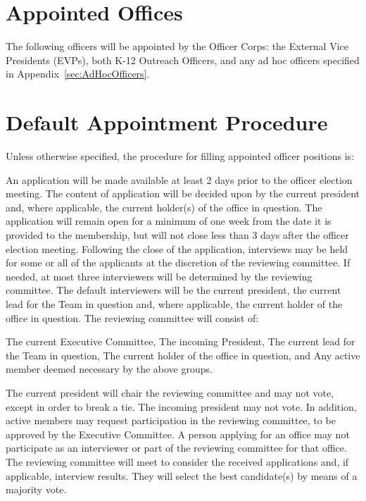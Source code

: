\section{Appointed Offices}\label{sec:appointedofficers} The following officers will be appointed by the Officer Corps: the External Vice Presidents (EVPs), both K-12 Outreach Officers, and any ad hoc officers specified in Appendix~\ref{sec:AdHocOfficers}. %
\section{Default Appointment Procedure} Unless otherwise specified, the procedure for filling appointed officer positions is: 
\begin{enumsubsection}
	\itemnotoc An application will be made available at least 2 days prior to the officer election meeting.
	\itemnotoc The content of application will be decided upon by the current president and, where applicable, the current holder(s) of the office in question. 
	\itemnotoc The application will remain open for a minimum of one week from the date it is provided to the membership, but will not close less than 3 days after the officer election meeting.
	\itemnotoc Following the close of the application, interviews may be held for some or all of the applicants at the discretion of the reviewing committee. If needed, at most three interviewers will be determined by the reviewing committee. The default interviewers will be the current president, the current lead for the Team in question and, where applicable, the current holder of the office in question.
	\itemnotoc The reviewing committee will consist of: \label{sec:defaultappointcomp}
	\begin{enumsubsubsection}
		\itemnotoc The current Executive Committee,
		\itemnotoc The incoming President,
		\itemnotoc The current lead for the Team in question,
		\itemnotoc The current holder of the office in question, and
		\itemnotoc Any active member deemed necessary by the above groups.
	\end{enumsubsubsection}
	The current president will chair the reviewing committee and may not vote, except in order to break a tie. The incoming president may not vote. In addition, active members may request participation in the reviewing committee, to be approved by the Executive Committee.
	\itemnotoc A person applying for an office may not participate as an interviewer or part of the reviewing committee for that office. \label{sec:defaultappointmentrestrictions}
	\itemnotoc The reviewing committee will meet to consider the received applications and, if applicable, interview results. They will select the best candidate(s) by means of a majority vote.
\end{enumsubsection}

